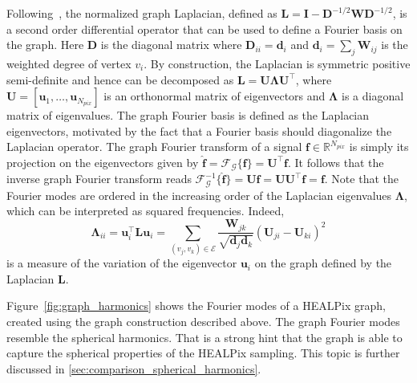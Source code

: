 \documentclass[final,twocolumn,3p,times,sort&compress]{elsarticle}
\newcommand{\figref}[1]{Figure~\ref{fig:#1}}
\renewcommand{\b}[1]{{\bm{#1}}}   %
\newcommand{\1}{\b{1}}              %
\newcommand{\0}{\b{0}}              %
\newcommand{\G}{\mathcal{G}}
\newcommand{\E}{\mathcal{E}}
\renewcommand{\L}{\b{L}}
\newcommand{\W}{\b{W}}
\newcommand{\I}{\b{I}}
\newcommand{\D}{\b{D}}
\newcommand{\U}{\b{U}}
\newcommand{\f}{\b{f}}
\newcommand{\trans}{^\intercal}
\newcommand{\R}{\mathbb{R}}
\newcommand{\bLambda}{\b{\Lambda}}
\begin{document}
Following~\cite{shuman2013emerging}, the normalized graph Laplacian,
defined as $\L = \I - \D^{-1/2} \W \D^{-1/2}$, is a second order differential operator
that can be used to define a Fourier basis on the graph. Here $\D$ is the diagonal
matrix where $\D_{ii} = \b{d}_i$ and $\b{d}_i = \sum_j \W_{ij}$ is the weighted degree of vertex $v_i$. By construction, the Laplacian is symmetric positive
semi-definite and hence can be decomposed as $\L = \U \bLambda \U\trans$, where $\U = [\b u_1, \ldots, \b u_{N_{pix}}]$ is an
orthonormal matrix of eigenvectors and $\bLambda$ is a diagonal matrix of
eigenvalues. The graph Fourier basis is defined as the Laplacian eigenvectors, motivated by the fact that a Fourier basis should diagonalize the Laplacian operator.
The graph Fourier transform of a signal $\f \in \R^{N_{pix}}$ is simply its projection on the eigenvectors given by
$\hat{\f} = \mathcal{F}_\G \{\f\} = \U\trans \f$. It follows that the inverse graph Fourier transform reads $\mathcal{F}^{-1}_\G \{\hat{\f}\} = \U\hat{\f} = \U \U\trans \f = \f$.
Note that the Fourier modes are ordered in the increasing order of the Laplacian eigenvalues $\bLambda$, which can be interpreted as squared frequencies.
Indeed,
\begin{equation*}
	\bLambda_{ii} = \b u_i\trans \L \b u_i = \sum_{(v_j, v_k) \in \E} \frac{\W_{jk}}{\sqrt{\b d_j \b d_k}} (\U_{ji} - \U_{ki})^2
\end{equation*}
is a measure of the variation of the eigenvector $\b u_i$ on the graph defined by the Laplacian $\L$.


\figref{graph_harmonics} shows the Fourier modes of a HEALPix graph, created using the graph construction described above.
The graph Fourier modes resemble the spherical harmonics.
That is a strong hint that the graph is able to capture the spherical properties of the HEALPix sampling.
This topic is further discussed in \ref{sec:comparison_spherical_harmonics}.
\end{document}
